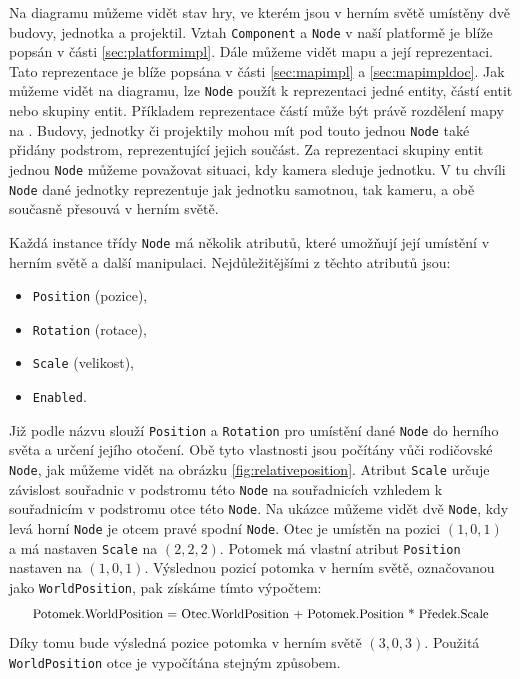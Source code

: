 Na diagramu můžeme vidět stav hry, ve kterém jsou v herním světě umístěny dvě budovy, jednotka a projektil. Vztah \texttt{Component} a \texttt{Node} v naší platformě je blíže popsán v části \ref{sec:platformimpl}. Dále můžeme vidět mapu a její reprezentaci. Tato reprezentace je blíže popsána v části \ref{sec:mapimpl} a \ref{sec:mapimpldoc}. Jak můžeme vidět na diagramu, lze \texttt{Node} použít k reprezentaci jedné entity, částí entit nebo skupiny entit. Příkladem reprezentace částí může být právě rozdělení mapy na . Budovy, jednotky či projektily mohou mít pod touto jednou \texttt{Node} také přidány podstrom, reprezentující jejich součást. Za reprezentaci skupiny entit jednou \texttt{Node} můžeme považovat situaci, kdy kamera sleduje jednotku. V tu chvíli \texttt{Node} dané jednotky reprezentuje jak jednotku samotnou, tak kameru, a obě současně přesouvá v herním světě.



Každá instance třídy \texttt{Node} má několik atributů, které umožňují její umístění v herním světě a další manipulaci. Nejdůležitějšími z těchto atributů jsou:

\begin{itemize}
	\item \texttt{Position} (pozice),
	\item \texttt{Rotation} (rotace),
	\item \texttt{Scale} (velikost),
	\item \texttt{Enabled}.
\end{itemize}

Již podle názvu slouží \texttt{Position} a \texttt{Rotation} pro umístění dané \texttt{Node} do herního světa a určení jejího otočení. Obě tyto vlastnosti jsou počítány vůči rodičovské \texttt{Node}, jak můžeme vidět na obrázku \ref{fig:relativeposition}. Atribut \texttt{Scale} určuje závislost souřadnic v podstromu této \texttt{Node} na souřadnicích vzhledem k souřadnicím v podstromu otce této \texttt{Node}. Na ukázce můžeme vidět dvě \texttt{Node}, kdy levá horní \texttt{Node} je otcem pravé spodní \texttt{Node}. Otec je umístěn na pozici \((1,0,1)\) a má nastaven \texttt{Scale} na \((2,2,2)\). Potomek má vlastní atribut \texttt{Position} nastaven na \((1,0,1)\). Výslednou pozicí potomka v herním světě, označovanou jako \texttt{WorldPosition}, pak získáme tímto výpočtem:\[\scalebox{0.9}{Potomek.WorldPosition = Otec.WorldPosition + Potomek.Position * Předek.Scale}\] Díky tomu bude výsledná pozice potomka v herním světě \((3,0,3)\). Použitá \texttt{WorldPosition} otce je vypočítána stejným způsobem.

